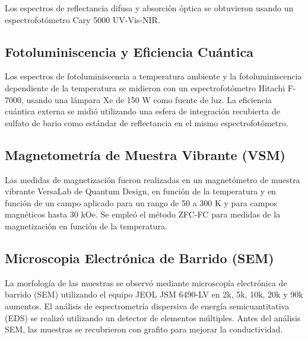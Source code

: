 Los espectros de reflectancia difusa y absorción óptica se obtuvieron usando un
espectrofotómetro Cary 5000 UV-Vis-NIR.

\subsection{Fotoluminiscencia y Eficiencia Cuántica}

Los espectros de fotoluminiscencia a temperatura ambiente y la
fotoluminiscencia dependiente de la temperatura se midieron con un
espectrofotómetro Hitachi F-7000, usando una lámpara Xe de 150 W como fuente de
luz. La eficiencia cuántica externa se midió utilizando una esfera de
integración recubierta de sulfato de bario como estándar de reflectancia en el
mismo espectrofotómetro.

\subsection{Magnetometría de Muestra Vibrante (VSM)}

Las medidas de magnetización fueron
realizadas en un magnetómetro de muestra vibrante VersaLab de Quantum Design, en
función de la temperatura y en función de un campo aplicado para un rango de
50 a 300 K y para campos magnéticos hasta 30 kOe. Se empleó el método ZFC-FC para
medidas de la magnetización en función de la temperatura.

\subsection{Microscopia Electrónica de Barrido (SEM)}

La morfología de las muestras se observó mediante microscopía electrónica de
barrido (SEM) utilizando el equipo JEOL JSM 6490-LV en 2k, 5k, 10k, 20k y 90k aumentos.
El análisis de espectrometría dispersiva de energía semicuantitativa (EDS) se
realizó utilizando un detector de elementos múltiples. Antes del análisis SEM,
las muestras se recubrieron con grafito para mejorar la conductividad.

